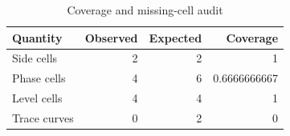 \begin{table}[htbp]
\centering
\caption{Coverage and missing-cell audit}
\small
\begin{tabular}{@{}lrrr@{}}
\toprule
Quantity & Observed & Expected & Coverage \\
\midrule
Side cells & 2 & 2 & 1 \\
Phase cells & 4 & 6 & 0.6666666667 \\
Level cells & 4 & 4 & 1 \\
Trace curves & 0 & 2 & 0 \\
\bottomrule
\end{tabular}
\end{table}
